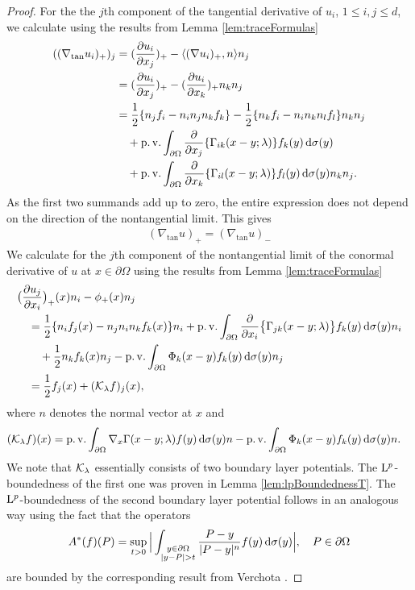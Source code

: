 \begin{proof}
  For the the $j$th component of the tangential derivative of $u_i$, $1\leq i,j \leq d$, we calculate using the results from Lemma \ref{lem:traceFormulas}
  \begin{align*}
    ((\nabla_{\mathrm{tan}} u_i)_+)_j
    &= (\frac{\partial u_i}{\partial x_j})_+ - \langle (\nabla u_i)_+, n \rangle n_j \\
    &= (\frac{\partial u_i}{\partial x_j} )_+ - (\frac{\partial u_i}{\partial x_k} )_+ n_k n_j \\
    &= \frac{1}{2} \{ n_j f_i - n_i n_j n_k f_k\} - \frac{1}{2} \{ n_k f_i - n_i n_k n_l f_l \} n_k n_j  \\
    &\quad+ \operatorname{p. v.} \int_{\partial\Omega} \frac{\partial}{\partial x_j} \{ \Gamma_{ik} (x - y; \lambda) \} f_k(y) \, {\operatorname{d}\!{\sigma}}(y) \\
    &\quad+ \operatorname{p. v.} \int_{\partial\Omega} \frac{\partial}{\partial x_k} \{ \Gamma_{il} (x - y; \lambda) \} f_l(y) \, {\operatorname{d}\!{\sigma}}(y) n_k n_j.
  \end{align*}
  As the first two summands add up to zero, the entire expression does not depend on the direction of the nontangential limit. 
  This gives
  \begin{align*}
    (\nabla_{\mathrm{tan}} u)_+ = (\nabla_{\mathrm{tan}} u)_-
  \end{align*}
  We calculate for the $j$th component of the nontangential limit of the conormal derivative of $u$ at $x \in \partial\Omega$ using the results from Lemma \ref{lem:traceFormulas}
  \begin{align*}
    &\big(\frac{\partial u_j}{\partial x_i}\big)_+(x) n_i - \phi_+(x) n_j\\
    &\quad= \frac{1}{2} \{ n_i f_j(x) - n_j n_i n_k f_k(x) \} n_i + \operatorname{p. v.} \int_{\partial\Omega} \frac{\partial}{\partial{x_i}} \big\{ \Gamma_{jk}(x - y; \lambda) \big\} f_k(y) \, {\operatorname{d}\!{\sigma}}(y) n_i \\
    &\qquad+ \frac{1}{2} n_k f_k(x) n_j - \operatorname{p. v.} \int_{\partial\Omega} \Phi_k(x - y) f_k(y) \, {\operatorname{d}\!{\sigma}}(y) n_j \\
    &\quad= \frac{1}{2} f_j(x) + (\mathcal{K}_\lambda f)_j(x),
  \end{align*}
  where $n$ denotes the normal vector at $x$ and
  \begin{align}
    \label{eq:defnKlambda}
    (\mathcal{K}_\lambda f) (x)
    &= \operatorname{p. v.} \int_{\partial\Omega} \nabla_x \Gamma(x - y; \lambda)  f(y) \, {\operatorname{d}\!{\sigma}}(y) n - \operatorname{p. v.} \int_{\partial\Omega} \Phi_k(x - y) f_k(y) \, {\operatorname{d}\!{\sigma}}(y) n.
  \end{align}
  We note that $\mathcal{K}_\lambda$ essentially consists of two boundary layer potentials. 
  The $\mathrm{L}^p$-boundedness of the first one was proven in Lemma \ref{lem:lpBoundednessT}.
  The $\mathrm{L}^p$-boundedness of the second boundary layer potential follows in an analogous way using the fact that the operators
  \begin{align*}
    A^*(f)(P) = \sup_{t > 0} \Big| \int_{\substack{y \in \partial\Omega \\ |y - P| > t}} \frac{P - y}{|P - y|^n} f(y) \, {\operatorname{d}\!{\sigma}}(y)\Big| , \quad P \in \partial\Omega
  \end{align*}
  are bounded by the corresponding result from Verchota \cite[Lem. 1.2]{verchota}.
\end{proof}


